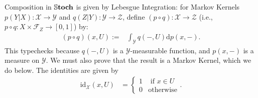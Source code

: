 \begin{defn}
    Composition in $\mathbb{S}\mathbf{toch}$ is given by Lebesgue Integration: for Markov Kernels $p(Y|X) : \mathcal X \to \mathcal Y$ and $q(Z|Y) : \mathcal Y \to \mathcal Z$, define
    $(p \circ q) : \mathcal X \to \mathcal Z$  (i.e., $p \circ q : X \times \mathcal F_Z \to [0,1]$) by:
    \begin{align*}
        (p\circ q)(x, U) :=& \int_{\mathcal Y}
            q(-, U)
            \mathrm d p(x,-).
    \end{align*}
    This typechecks because $q(-,U)$ is a $\mathcal Y$-measurable function, and $p(x,-)$ is a measure on $\mathcal Y$. 
    We must also prove that the result is a Markov Kernel, which we do below. 
    The identities are given by
    \begin{align*}
    \mathrm{id}_{\mathcal X}(x, U) &= \begin{cases}
            1 & \text{ if }x \in U \\ 0 & \text{otherwise}
        \end{cases}.
    \end{align*}
\end{defn}













